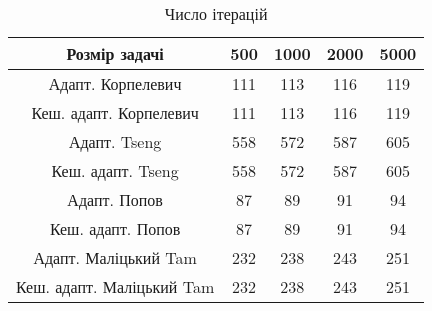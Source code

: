 \begin{table}[H]
	\centering
	\begin{tabular}{|c||c|c|c|c|}\hline
		Розмір задачі & 500 & 1000 & 2000 & 5000 \\ \hline \hline
		Адапт. Корпелевич & 111 & 113 & 116 & 119 \\ \hline
		Кеш. адапт. Корпелевич & 111 & 113 & 116 & 119 \\ \hline
		Адапт. Tseng & 558 & 572 & 587 & 605 \\ \hline
		Кеш. адапт. Tseng & 558 & 572 & 587 & 605 \\ \hline
		Адапт. Попов & 87 & 89 & 91 & 94 \\ \hline
		Кеш. адапт. Попов & 87 & 89 & 91 & 94 \\ \hline
		Адапт. Маліцький Tam & 232 & 238 & 243 & 251 \\ \hline
		Кеш. адапт. Маліцький Tam & 232 & 238 & 243 & 251 \\ \hline
	\end{tabular}
	\caption{Число ітерацій}
\end{table}
